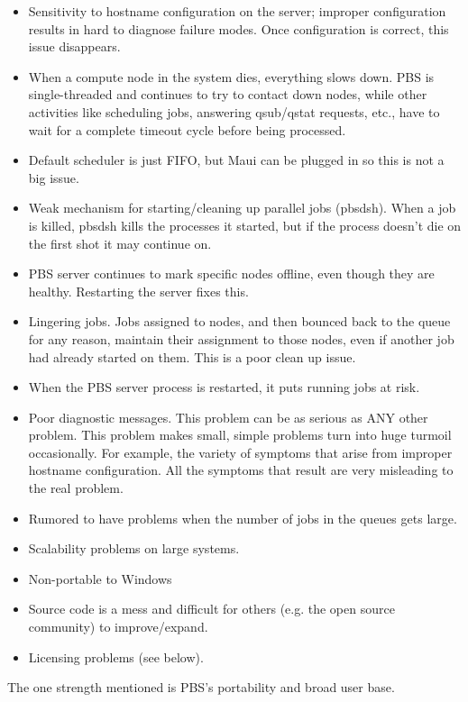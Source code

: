 \begin{itemize}
\item Sensitivity to hostname configuration on the server; improper 
      configuration results in hard to diagnose failure modes.  Once 
      configuration is correct, this issue disappears.
\item When a compute node in the system dies, everything slows down.  
      PBS is single-threaded and continues to try to contact down nodes,
      while other activities like scheduling jobs, answering qsub/qstat 
      requests, etc., have to wait for a complete timeout cycle before being
      processed.
\item Default scheduler is just FIFO, but Maui can be plugged in so this
      is not a big issue.
\item Weak mechanism for starting/cleaning up parallel jobs (pbsdsh).
      When a job is killed, pbsdsh kills the processes it started, but
      if the process doesn't die on the first shot it may continue on.
\item PBS server continues to mark specific nodes offline, even though they 
      are healthy.  Restarting the server fixes this.
\item Lingering jobs.  Jobs assigned to nodes, and then bounced back to the 
      queue for any reason, maintain their assignment to those nodes, even 
      if another job had already started on them.  This is a poor clean up 
      issue.
\item When the PBS server process is restarted, it puts running jobs at risk.
\item Poor diagnostic messages.  This problem can be as serious as ANY other 
      problem.  This problem makes small, simple problems turn into huge 
      turmoil occasionally.  For example, the variety of symptoms that arise 
      from improper hostname configuration.  All the symptoms that result are 
      very misleading to the real problem.
\item Rumored to have problems when the number of jobs in the queues gets
      large.
\item Scalability problems on large systems.
\item Non-portable to Windows
\item Source code is a mess and difficult for others (e.g. the open source
      community) to improve/expand.
\item Licensing problems (see below).
\end{itemize}
The one strength mentioned is PBS's portability and broad user base.

